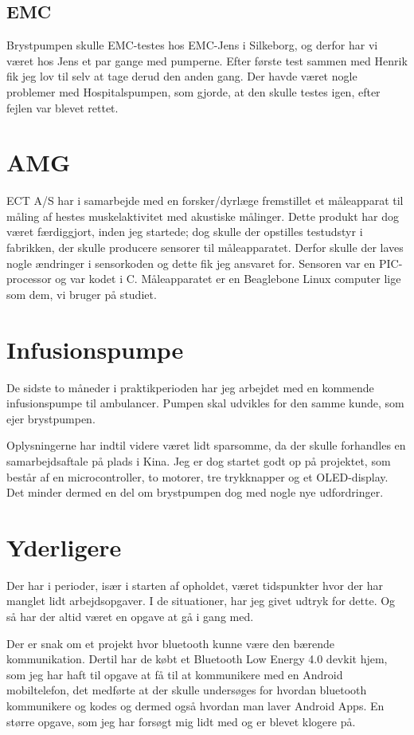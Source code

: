 \subsection{EMC}

Brystpumpen skulle EMC-testes hos EMC-Jens i Silkeborg, og derfor har vi været hos Jens et par gange med pumperne. Efter første test sammen med Henrik fik jeg lov til selv at tage derud den anden gang. Der havde været nogle problemer med Hospitalspumpen, som gjorde, at den skulle testes igen, efter fejlen var blevet rettet.

\section{AMG}

ECT A/S har i samarbejde med en forsker/dyrlæge fremstillet et måleapparat til måling af hestes muskelaktivitet med akustiske målinger. Dette produkt har dog været færdiggjort, inden jeg startede; dog skulle der opstilles testudstyr i fabrikken, der skulle producere sensorer til måleapparatet. Derfor skulle der laves nogle ændringer i sensorkoden og dette fik jeg ansvaret for. Sensoren var en PIC-processor og var kodet i C. Måleapparatet er en Beaglebone Linux computer lige som dem, vi bruger på studiet. 

\section{Infusionspumpe}

De sidste to måneder i praktikperioden har jeg arbejdet med en kommende infusionspumpe til ambulancer. Pumpen skal udvikles for den samme kunde, som ejer brystpumpen.

Oplysningerne har indtil videre været lidt sparsomme, da der skulle forhandles en samarbejdsaftale på plads i Kina. Jeg er dog startet godt op på projektet, som består af en microcontroller, to motorer, tre trykknapper og et OLED-display. Det minder dermed en del om brystpumpen dog med nogle nye udfordringer.

\section{Yderligere}

Der har i perioder, især i starten af opholdet, været tidspunkter hvor der har manglet lidt arbejdsopgaver. I de situationer, har jeg givet udtryk for dette. Og så har der altid været en opgave at gå i gang med.

Der er snak om et projekt hvor bluetooth kunne være den bærende kommunikation. Dertil har de købt et Bluetooth Low Energy 4.0 devkit hjem, som jeg har haft til opgave at få til at kommunikere med en Android mobiltelefon, det medførte at der skulle undersøges for hvordan bluetooth kommunikere og kodes og dermed også hvordan man laver Android Apps. En større opgave, som jeg har forsøgt mig lidt med og er blevet klogere på.
